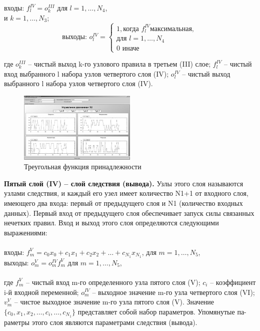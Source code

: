 \documentclass{article}
\begin{document}
  \begin{center}
    входы: $f_l^{IV}=o_k^{III}$ для $l=1,\ldots,N_4$,\\
    и $k=1,\ldots,N_3$;\\
    $$\text{выходы: }o_l^{IV}=
    \begin{cases}
      1, \text{когда } f_l^{IV} \text{максимальная},\\
      \text{для } l=1,\ldots,N_4 \\
      0 \text{ иначе}
    \end{cases}$$
  \end{center}
  {
    где $o_k^{III}$ -- чистый выход k-го узлового правила в третьем (III) слое; $f_l^{IV}$ -- чистый
    вход выбранного l набора узлов четвертого слоя (IV); $o_l^{IV}$ -- чистый выход выбранного l набора узлов 
    четвертого слоя (IV).
  }
  \begin{figure} [H]
    \centering
    \includegraphics[width=0.5\textwidth]{Figures/pic_4.png}
    \caption{\label{fig:system}Треугольная функция принадлежности}
  \end{figure}
  {
    \indent\indent \textbf{Пятый слой (IV) – слой следствия (вывода).} Узлы этого слоя называются узлами следствия, и каждый его узел 
    имеет количество N1+1 от входного слоя, имеющего два входа: первый от предыдущего слоя и N1 (количество входных данных). 
    Первый вход от предыдущего слоя обеспечивает запуск силы связанных нечетких правил. 
    Вход и выход этого слоя определяются следующими выражениями:\\
  }
  {
    \\\indent\indent входы: $f_m^V=c_0x_0+c_1x_1+c_2x_2+\ldots+c_{N_{1}}x_{N_{1}}$, для $m=1,\ldots,N_5$,\\
    \indent\indent выходы: $o_m^V=o_m^{IV}f_m^V$ для $m=1,\ldots,N_5$,\\\\
  }
  {
    где $f_m^V$ -- чистый вход m-го определенного узла пятого слоя (V); $c_i$ -- коэффициент i-й входной переменной;
    $o_m^{IV}$ -- выходное значение m-го узла четвертого слоя (VI); $v_m^V$ -- чистое выходное значение m-го узла пятого 
    слоя (V). Значение $\{c_0,x_1,x_2,\ldots,c_i,\ldots,c_{N_{1}}\}$ представляет собой набор параметров. Упомянутые па-
    раметры этого слоя являются параметрами следствия (вывода).\\
  }
\end{document}
